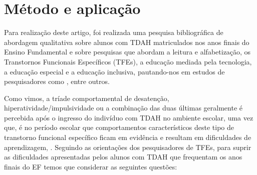 \documentclass{textolivre}
\begin{document}
\section{Método e aplicação}\label{sec-metodo}
Para realização deste artigo, foi realizada uma pesquisa bibliográfica de abordagem qualitativa sobre alunos com TDAH matriculados nos anos finais do Ensino Fundamental e sobre pesquisas que abordam a leitura e alfabetização, os Transtornos Funcionais Específicos (TFEs), a educação mediada pela tecnologia, a educação especial e a educação inclusiva, pautando-nos em estudos de pesquisadores como \textcite{alexander_2004, antunes_glossario_2001, borgesdalberio_inclusao_2012, coscarelliribeiro_2005, menezes_tecnologias_2019, silva_neto_educacao_2018, rojo_multiletramentos_2012, rojo_generos_2013, andrade_transtorno_2018, goncalves_inclusao_2019, lopes_inclusao_2011, coscarelliribeiro_2005, rohde_transtorno_1999, amorim_TDAH}, entre outros. 

Como vimos, a tríade comportamental de desatenção, hiperatividade/impulsividade ou a combinação das duas últimas geralmente é percebida após o ingresso do indivíduo com TDAH no ambiente escolar, uma vez que, é no período escolar que comportamentos característicos deste tipo de transtorno funcional específico ficam em evidência e resultam em dificuldades de aprendizagem, \cite{pain_diagnostico_1985}. Seguindo as orientações dos pesquisadores de TFEs, para suprir as dificuldades apresentadas pelos alunos com TDAH que frequentam os anos finais do EF temos que considerar as seguintes questões:
\end{document}
